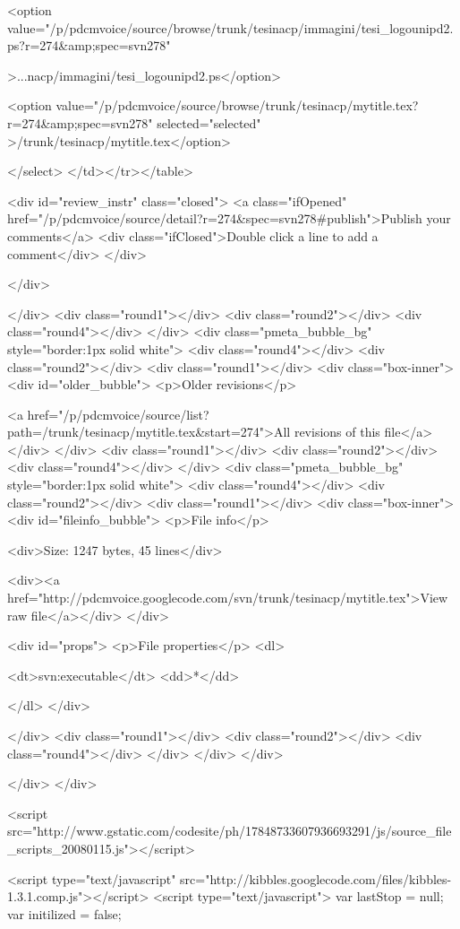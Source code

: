  <option value="/p/pdcmvoice/source/browse/trunk/tesinacp/immagini/tesi_logounipd2.ps?r=274&amp;spec=svn278"
 
 >...nacp/immagini/tesi_logounipd2.ps</option>
 
 <option value="/p/pdcmvoice/source/browse/trunk/tesinacp/mytitle.tex?r=274&amp;spec=svn278"
 selected="selected"
 >/trunk/tesinacp/mytitle.tex</option>
 
 </select>
 </td></tr></table>
 
 
 
 <div id="review_instr" class="closed">
 <a class="ifOpened" href="/p/pdcmvoice/source/detail?r=274&spec=svn278#publish">Publish your comments</a>
 <div class="ifClosed">Double click a line to add a comment</div>
 </div>
 
 </div>
 
 
 </div>
 <div class="round1"></div>
 <div class="round2"></div>
 <div class="round4"></div>
 </div>
 <div class="pmeta_bubble_bg" style="border:1px solid white">
 <div class="round4"></div>
 <div class="round2"></div>
 <div class="round1"></div>
 <div class="box-inner">
 <div id="older_bubble">
 <p>Older revisions</p>
 
 <a href="/p/pdcmvoice/source/list?path=/trunk/tesinacp/mytitle.tex&start=274">All revisions of this file</a>
 </div>
 </div>
 <div class="round1"></div>
 <div class="round2"></div>
 <div class="round4"></div>
 </div>
 <div class="pmeta_bubble_bg" style="border:1px solid white">
 <div class="round4"></div>
 <div class="round2"></div>
 <div class="round1"></div>
 <div class="box-inner">
 <div id="fileinfo_bubble">
 <p>File info</p>
 
 <div>Size: 1247 bytes,
 45 lines</div>
 
 <div><a href="http://pdcmvoice.googlecode.com/svn/trunk/tesinacp/mytitle.tex">View raw file</a></div>
 </div>
 
 <div id="props">
 <p>File properties</p>
 <dl>
 
 <dt>svn:executable</dt>
 <dd>*</dd>
 
 </dl>
 </div>
 
 </div>
 <div class="round1"></div>
 <div class="round2"></div>
 <div class="round4"></div>
 </div>
 </div>
 </div>


</div>
</div>

<script src="http://www.gstatic.com/codesite/ph/17848733607936693291/js/source_file_scripts_20080115.js"></script>

 <script type="text/javascript" src="http://kibbles.googlecode.com/files/kibbles-1.3.1.comp.js"></script>
 <script type="text/javascript">
 var lastStop = null;
 var initilized = false;
 
